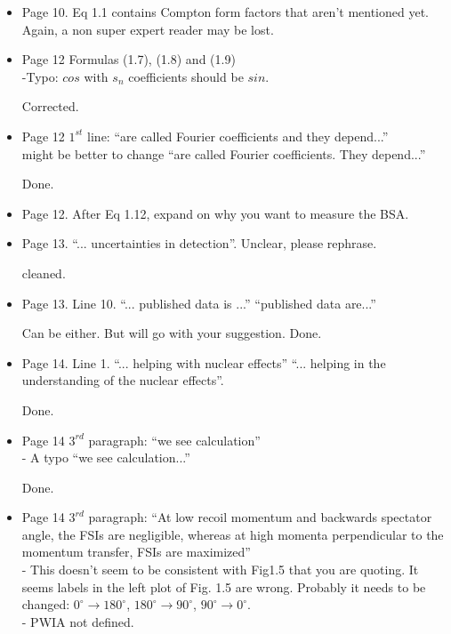 \begin{itemize}
  \item Page 10. Eq 1.1 contains Compton form factors that aren't mentioned 
     yet. Again, a non super expert reader may be lost.
  
  
  \item Page 12 Formulas (1.7), (1.8) and (1.9) \\
  -Typo: $cos$ with $s_{n}$ coefficients should be $sin$.
  
     {\color{red} Corrected.}
  
  \item Page 12 $1^{st}$ line:  ``are called Fourier coefficients and they 
     depend...'' \\
  might be better to change ``are called Fourier coefficients. They depend...''
     
       {\color{red} Done.}
  
  \item Page 12. After Eq 1.12, expand on why you want to measure the BSA.
  
  \item Page 13. ``... uncertainties in detection''. Unclear, please rephrase.
     
     {\color{red} cleaned.}
  
  \item Page 13. Line 10. ``... published data is ...'' \rarr ``published data are...''
     
     {\color{red} Can be either. But will go with your suggestion. Done.}
  
  \item Page 14. Line 1. ``... helping with nuclear effects'' \rarr ``...  
     helping in the understanding of the nuclear effects''.
     
       {\color{red} Done.}
  
  \item Page 14 $3^{rd}$ paragraph: ``we see calculation''\\
  - A typo ``we see calculation...''
     
     {\color{red} Done.}
  
  \item Page 14 $3^{rd}$ paragraph: ``At low recoil momentum and
backwards spectator angle, the FSIs are negligible, whereas at high momenta perpendicular
to the momentum transfer, FSIs are maximized'' \\ 
  - This doesn't seem to be consistent with Fig1.5 that you are quoting. It seems labels in the left plot of Fig. 1.5 are wrong. Probably it needs to be changed: $0^{\circ}\rightarrow 180^{\circ}$, $180^{\circ}\rightarrow 90^{\circ}$, $90^{\circ}\rightarrow 0^{\circ}$.\\
  - PWIA not defined.
  

\end{itemize}
